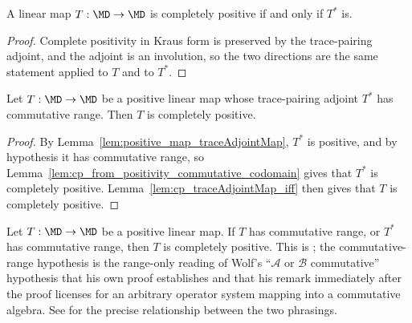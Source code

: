 \begin{lemma}
    \label{lem:cp_traceAdjointMap_iff}
    \leanok
    A linear map $T:\MD\to\MD$ is completely positive if and only if $T^*$
    is.
\end{lemma}

\begin{proof}\leanok
    Complete positivity in Kraus form is preserved by the trace-pairing
    adjoint, and the adjoint is an involution, so the two directions are
    the same statement applied to $T$ and to $T^*$.
\end{proof}

\begin{lemma}
    \label{lem:cp_from_positivity_commutative_domain}
    \leanok
    Let $T:\MD\to\MD$ be a positive linear map whose trace-pairing adjoint
    $T^*$ has commutative range. Then $T$ is completely positive.
\end{lemma}

\begin{proof}\leanok
    By Lemma~\ref{lem:positive_map_traceAdjointMap}, $T^*$ is positive, and
    by hypothesis it has commutative range, so
    Lemma~\ref{lem:cp_from_positivity_commutative_codomain} gives that $T^*$
    is completely positive. Lemma~\ref{lem:cp_traceAdjointMap_iff} then
    gives that $T$ is completely positive.
\end{proof}

\begin{theorem}\label{thm:cp_from_positivity_commutative}
    \leanok
    Let $T:\MD\to\MD$ be a positive linear map. If $T$ has commutative
    range, or $T^*$ has commutative range, then $T$ is completely positive.
    This is \cite[Proposition~1.6]{Wolf2012Quantum}; the commutative-range
    hypothesis is the range-only reading of Wolf's ``$\mathcal A$ or
    $\mathcal B$ commutative'' hypothesis that his own proof establishes and
    that his remark immediately after the proof licenses for an arbitrary
    operator system mapping into a commutative algebra. See
    for the precise relationship between the two phrasings.
\end{theorem}

